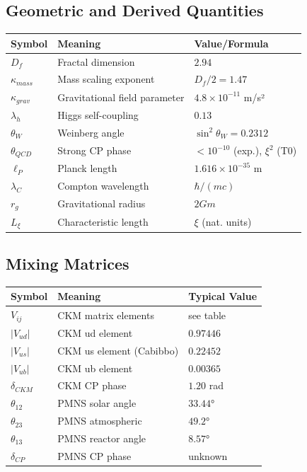 \documentclass[12pt,a4paper]{report}
\begin{document}
\subsection{Geometric and Derived Quantities}
\begin{longtable}{lll}
	\toprule
	\textbf{Symbol} & \textbf{Meaning} & \textbf{Value/Formula} \\
	\midrule
	$D_f$ & Fractal dimension & $2.94$ \\
	$\kappa_{mass}$ & Mass scaling exponent & $D_f/2 = 1.47$ \\
	$\kappa_{grav}$ & Gravitational field parameter & $4.8 \times 10^{-11}$ m/s² \\
	$\lambda_h$ & Higgs self-coupling & $0.13$ \\
	$\theta_W$ & Weinberg angle & $\sin^2\theta_W = 0.2312$ \\
	$\theta_{QCD}$ & Strong CP phase & $< 10^{-10}$ (exp.), $\xi^2$ (T0) \\
	$\ell_P$ & Planck length & $1.616 \times 10^{-35}$ m \\
	$\lambda_C$ & Compton wavelength & $\hbar/(mc)$ \\
	$r_g$ & Gravitational radius & $2Gm$ \\
	$L_\xi$ & Characteristic length & $\xi$ (nat. units) \\
	\bottomrule
\end{longtable}
\normalsize

\subsection{Mixing Matrices}
\begin{longtable}{lll}
	\toprule
	\textbf{Symbol} & \textbf{Meaning} & \textbf{Typical Value} \\
	\midrule
	$V_{ij}$ & CKM matrix elements & see table \\
	$|V_{ud}|$ & CKM ud element & $0.97446$ \\
	$|V_{us}|$ & CKM us element (Cabibbo) & $0.22452$ \\
	$|V_{ub}|$ & CKM ub element & $0.00365$ \\
	$\delta_{CKM}$ & CKM CP phase & $1.20$ rad \\
	$\theta_{12}$ & PMNS solar angle & $33.44°$ \\
	$\theta_{23}$ & PMNS atmospheric & $49.2°$ \\
	$\theta_{13}$ & PMNS reactor angle & $8.57°$ \\
	$\delta_{CP}$ & PMNS CP phase & unknown \\
	\bottomrule
\end{longtable}
\normalsize
\end{document}
